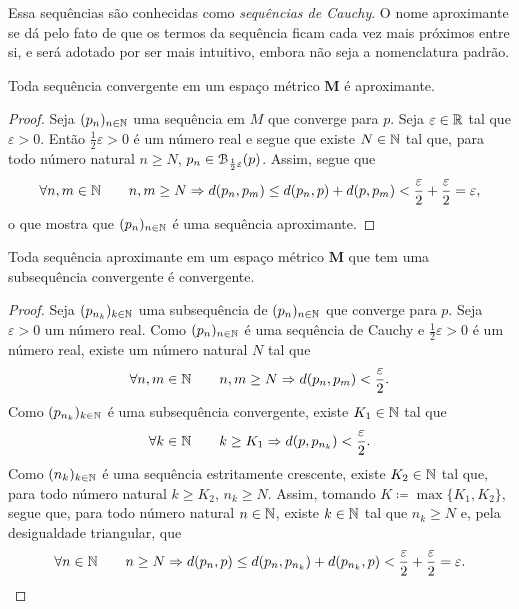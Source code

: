 Essa sequências são conhecidas como \emph{sequências de Cauchy}. O nome aproximante se dá pelo fato de que os termos da sequência ficam cada vez mais próximos entre si, e será adotado por ser mais intuitivo, embora não seja a nomenclatura padrão.

\begin{prop}
Toda sequência convergente em um espaço métrico $\bm M$ é aproximante.
\end{prop}
\begin{proof}
Seja $(p_n)_{n \in \mathbb{N}}$ uma sequência em $M$ que converge para $p$. Seja $\varepsilon \in \mathbb{R}$ tal que $\varepsilon > 0$. Então $\frac{1}{2}\varepsilon > 0$ é um número real e segue que existe $N \in \mathbb{N}$ tal que, para todo número natural $n \geq N$, $p_n \in \mathcal{B}_{\frac{1}{2}\varepsilon}(p)$. Assim, segue que	
	\begin{equation*}
	\forall n,m \in \mathbb{N} \qquad n,m \geq N \Rightarrow d(p_n,p_m) \leq d(p_n,p) + d(p,p_m) < \frac{\varepsilon}{2} + \frac{\varepsilon}{2} = \varepsilon,
	\end{equation*}
o que mostra que $(p_n)_{n \in \mathbb{N}}$ é uma sequência aproximante.
\end{proof}

\begin{prop}
Toda sequência aproximante em um espaço métrico $\bm M$ que tem uma subsequência convergente é convergente.
\end{prop}
\begin{proof}
	Seja $(p_{n_k})_{k \in \mathbb{N}}$ uma subsequência de $(p_n)_{n \in \mathbb{N}}$ que converge  para $p$. Seja $\varepsilon > 0$ um número real. Como $(p_n)_{n \in \mathbb{N}}$ é uma sequência de Cauchy e $\frac{1}{2}\varepsilon > 0$ é um número real, existe um número natural $N$ tal que
	\begin{equation*}
	\forall n,m \in \mathbb{N} \qquad n,m \geq N \Rightarrow d(p_n,p_m) < \frac{\varepsilon}{2}.
	\end{equation*}
Como $(p_{n_k})_{k \in \mathbb{N}}$ é uma subsequência convergente, existe $K_1 \in \mathbb{N}$ tal que
	\begin{equation*}
	\forall k \in \mathbb{N} \qquad k \geq K_1 \Rightarrow d(p,p_{n_k}) < \frac{\varepsilon}{2}.
	\end{equation*}
Como $(n_k)_{k \in \mathbb{N}}$ é uma sequência estritamente crescente, existe $K_2 \in \mathbb{N}$ tal que, para todo número natural $k \geq K_2$, $n_k \geq N$. Assim, tomando $K \coloneqq \max\{K_1,K_2\}$, segue que, para todo número natural $n \in \mathbb{N}$, existe $k \in \mathbb{N}$ tal que $n_k \geq N$ e,  pela desigualdade triangular, que
	\begin{equation*}
	\forall n \in \mathbb{N} \qquad n \geq N \Rightarrow d(p_n,p) \leq d(p_n,p_{n_k}) + d(p_{n_k},p) < \frac{\varepsilon}{2}+\frac{\varepsilon}{2}=\varepsilon.
	\end{equation*}
\end{proof}

